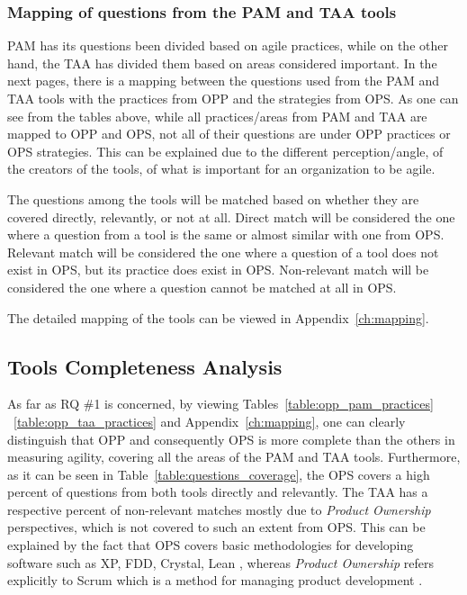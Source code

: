 \subsubsection[\ac{PAM} and \ac{TAA} Mapping]{Mapping of questions from the \ac{PAM} and \ac{TAA} tools}
\label{mapping}

\ac{PAM} has its questions been divided based on agile practices, while on the other hand, the \ac{TAA} has divided them based on areas considered important. In the next pages, there is a mapping between the questions used from the \ac{PAM} and \ac{TAA} tools with the practices from \ac{OPP} and the strategies from \ac{OPS}. As one can see from the tables above, while all practices/areas from \ac{PAM} and \ac{TAA} are mapped to \ac{OPP} and \ac{OPS}, not all of their questions are under \ac{OPP} practices or \ac{OPS} strategies. This can be explained due to the different perception/angle, of the creators of the tools, of what is important for an organization to be agile.

The questions among the tools will be matched based on whether they are covered directly, relevantly, or not at all. Direct match will be considered the one where a question from a tool is the same or almost similar with one from \ac{OPS}. Relevant match will be considered the one where a question of a tool does not exist in \ac{OPS}, but its practice does exist in \ac{OPS}. Non-relevant match will be considered the one where a question cannot be matched at all in \ac{OPS}. 

The detailed mapping of the tools can be viewed in Appendix~\ref{ch:mapping}.

\subsection{Tools Completeness Analysis}
\label{subsec:tools_completeness_analysis}
As far as RQ \#1 is concerned, by viewing Tables~\ref{table:opp_pam_practices} ~\ref{table:opp_taa_practices} and Appendix~\ref{ch:mapping}, one can clearly distinguish that \ac{OPP} and consequently \ac{OPS} is more complete than the others in measuring agility, covering all the areas of the \ac{PAM} and \ac{TAA} tools. Furthermore, as it can be seen in Table~\ref{table:questions_coverage}, the \ac{OPS} covers a high percent of questions from both tools directly and relevantly. The \ac{TAA} has a respective percent of non-relevant matches mostly due to \textit{Product Ownership} perspectives, which is not covered to such an extent from \ac{OPS}. This can be explained by the fact that \ac{OPS} covers basic  methodologies for developing software such as XP, FDD, Crystal, Lean \cite[p. 44]{sventha_dissertation}, whereas \textit{Product Ownership} refers explicitly to Scrum which is a method for managing product development \cite{koch2005agile}.

